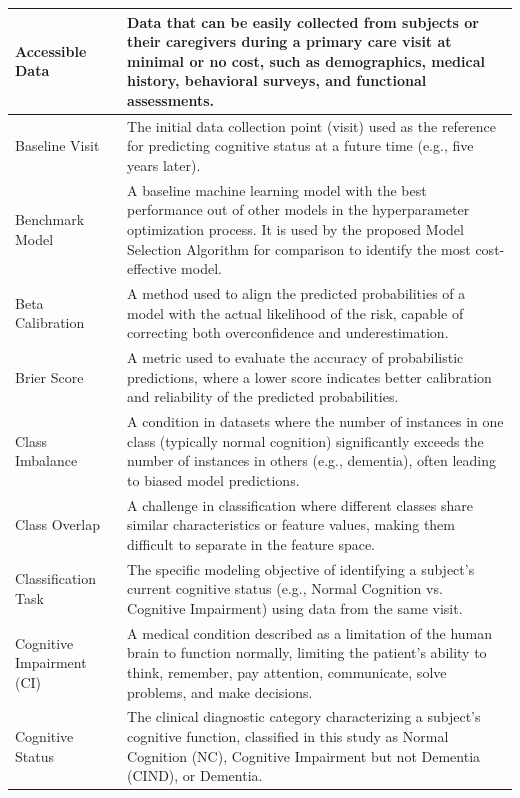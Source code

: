 \begin{longtable}{|M{3cm}|M{9.5cm}|}
    \hline
    \endfoot
        Accessible Data & Data that can be easily collected from subjects or their caregivers during a primary care visit at minimal or no cost, such as demographics, medical history, behavioral surveys, and functional assessments. \\ \hline
        Baseline Visit & The initial data collection point (visit) used as the reference for predicting cognitive status at a future time (e.g., five years later). \\ \hline
        Benchmark Model & A baseline machine learning model with the best performance out of other models in the hyperparameter optimization process. It is used by the proposed Model Selection Algorithm for comparison to identify the most cost-effective model. \\ \hline
        Beta Calibration & A method used to align the predicted probabilities of a model with the actual likelihood of the risk, capable of correcting both overconfidence and underestimation. \\ \hline
        Brier Score & A metric used to evaluate the accuracy of probabilistic predictions, where a lower score indicates better calibration and reliability of the predicted probabilities. \\ \hline
        Class Imbalance & A condition in datasets where the number of instances in one class (typically normal cognition) significantly exceeds the number of instances in others (e.g., dementia), often leading to biased model predictions. \\ \hline
        Class Overlap & A challenge in classification where different classes share similar characteristics or feature values, making them difficult to separate in the feature space. \\ \hline
        Classification Task & The specific modeling objective of identifying a subject's current cognitive status (e.g., Normal Cognition vs. Cognitive Impairment) using data from the same visit. \\ \hline
        Cognitive Impairment (CI) & A medical condition described as a limitation of the human brain to function normally, limiting the patient's ability to think, remember, pay attention, communicate, solve problems, and make decisions. \\ \hline
        Cognitive Status & The clinical diagnostic category characterizing a subject's cognitive function, classified in this study as Normal Cognition (NC), Cognitive Impairment but not Dementia (CIND), or Dementia. \\ \hline

\end{longtable}
